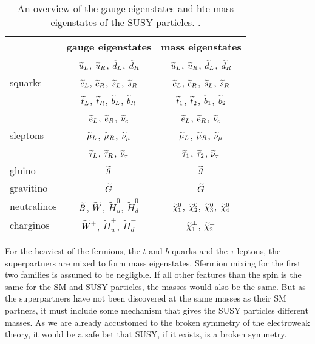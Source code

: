 \begin{table}[ht!]
\def\arraystretch{1.2}
\setlength{\belowcaptionskip}{6pt}
\small
\centering
\caption{An overview of the gauge eigenstates and hte mass eigenstates of the SUSY particles. \cite{Martin:1997ns}.}
\label{tab:eigenstates}
\begin{tabular}{l c c}
        \hline \hline
                                 & gauge eigenstates                                                 & mass eigenstates \\\hline
        \multirow{3}{*}{squarks} & $\widetilde{u}_{L}$, $\widetilde{u}_{R}$, $\widetilde{d}_{L}$, $\widetilde{d}_{R}$                            & $\widetilde{u}_{L}$, $\widetilde{u}_{R}$, $\widetilde{d}_{L}$, $\widetilde{d}_{R}$\\
                                 & $\widetilde{c}_{L}$, $\widetilde{c}_{R}$, $\widetilde{s}_{L}$, $\widetilde{s}_{R}$                                    & $\widetilde{c}_{L}$, $\widetilde{c}_{R}$, $\widetilde{s}_{L}$, $\widetilde{s}_{R}$\\
                                 & $\widetilde{t}_{L}$, $\widetilde{t}_{R}$, $\widetilde{b}_{L}$, $\widetilde{b}_{R}$                                    & $\widetilde{t}_{1}$, $\widetilde{t}_{2}$, $\widetilde{b}_{1}$, $\widetilde{b}_{2}$\\\hline
        \multirow{3}{*}{sleptons}& $\widetilde{e}_{L}$, $\widetilde{e}_{R}$, $\widetilde{\nu}_{e}$                                          & $\widetilde{e}_{L}$, $\widetilde{e}_{R}$, $\widetilde{\nu}_{e}$\\
                                 & $\widetilde{\mu}_{L}$, $\widetilde{\mu}_{R}$, $\widetilde{\nu}_{\mu}$                                        & $\widetilde{\mu}_{L}$, $\widetilde{\mu}_{R}$, $\widetilde{\nu}_{\mu}$\\
                                 & $\widetilde{\tau}_{L}$, $\widetilde{\tau}_{R}$, $\widetilde{\nu}_{\tau}$                                      & $\widetilde{\tau}_{1}$, $\widetilde{\tau}_{2}$, $\widetilde{\nu}_{\tau}$\\\hline
        gluino                   & $\widetilde{g}$                                                         & $\widetilde{g}$\\\hline
        gravitino                & $\widetilde{G}$                                                      & $\widetilde{G}$\\\hline
        neutralinos              & $\widetilde{B}$, $\widetilde{W}$, $\widetilde{H}^{0}_{u}$, $\widetilde{H}^{0}_{d}$& $\widetilde{\chi}^{0}_{1}$, $\widetilde{\chi}^{0}_{2}$, $\widetilde{\chi}^{0}_{3}$, $\widetilde{\chi}^{0}_{4}$\\\hline
        charginos                & $\widetilde{W}^{\pm}$, $\widetilde{H}^{+}_{u}$, $\widetilde{H}^{-}_{d}$   & $\widetilde{\chi}^\pm_{1}$, $\widetilde{\chi}^\pm_{2}$\\
\hline\hline
\end{tabular}
\end{table}                                                                                                                                                                                             
For the heaviest of the fermions, the $t$ and $b$ quarks and the $\tau$ leptons, the superpartners are mixed to form mass eigenstates. 
Sfermion mixing for the first two families is assumed to be negligble.  
If all other features than the spin is the same for the SM and SUSY particles, the masses would also be the same. 
But as the superpartners have not been discovered at the same masses as their SM partners, it must include some mechanism that gives the SUSY particles different masses. 
As we are already accustomed to the broken symmetry of the electroweak theory, it would be a safe bet that SUSY, if it exists, is a broken symmetry. 

